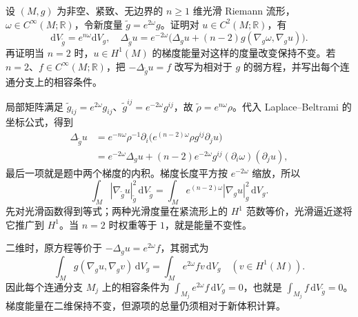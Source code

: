 \begin{exercise}
\label{b2:ex:26-conformal-change}
设 \((M,g)\) 为非空、紧致、无边界的 \(n\geq1\) 维光滑 Riemann 流形，\(\omega\in C^\infty(M;\mathbb R)\)，令新度量 \(\widetilde g=e^{2\omega}g\)。证明对 \(u\in C^2(M;\mathbb R)\)，有
\[
 \mathrm dV_{\widetilde g}=e^{n\omega}\mathrm dV_g,
 \quad \Delta_{\widetilde g}u
 =e^{-2\omega}\bigl(\Delta_g u
     +(n-2)g(\nabla_g\omega,\nabla_g u)\bigr).
\]
再证明当 \(n=2\) 时，\(u\in H^1(M)\) 的梯度能量对这样的度量改变保持不变。若 \(n=2\)、\(f\in C^\infty(M;\mathbb R)\)，把 \(-\Delta_{\widetilde g}u=f\) 改写为相对于 \(g\) 的弱方程，并写出每个连通分支上的相容条件。
\end{exercise}
\begin{solution}
局部矩阵满足 \(\widetilde g_{ij}=e^{2\omega}g_{ij}\)、\(\widetilde g^{ij}=e^{-2\omega}g^{ij}\)，故
\(\widetilde\rho=e^{n\omega}\rho\)。代入 Laplace--Beltrami 的坐标公式，得到
\[
 \begin{aligned}
 \Delta_{\widetilde g}u
 &=e^{-n\omega}\rho^{-1}
     \partial_i\bigl(e^{(n-2)\omega}\rho g^{ij}\partial_ju\bigr)\\
 &=e^{-2\omega}\Delta_gu
   +(n-2)e^{-2\omega}g^{ij}(\partial_i\omega)(\partial_ju),
 \end{aligned}
\]
最后一项就是题中两个梯度的内积。梯度长度平方按 \(e^{-2\omega}\) 缩放，所以
\[
 \int_M|\nabla_{\widetilde g}u|_{\widetilde g}^2\,\mathrm dV_{\widetilde g}
 =\int_Me^{(n-2)\omega}|\nabla_gu|_g^2\,\mathrm dV_g.
\]
先对光滑函数得到等式；两种光滑度量在紧流形上的 \(H^1\) 范数等价，光滑逼近遂将它推广到 \(H^1\)。当 \(n=2\) 时权重等于 \(1\)，就是能量不变性。

二维时，原方程等价于 \(-\Delta_gu=e^{2\omega}f\)，其弱式为
\[
 \int_Mg(\nabla_gu,\nabla_gv)\,\mathrm dV_g
 =\int_Me^{2\omega}fv\,\mathrm dV_g
 \quad(v\in H^1(M)).
\]
因此每个连通分支 \(M_j\) 上的相容条件为
\(\int_{M_j}e^{2\omega}f\,\mathrm dV_g=0\)，也就是
\(\int_{M_j}f\,\mathrm dV_{\widetilde g}=0\)。梯度能量在二维保持不变，但源项的总量仍须相对于新体积计算。
\end{solution}

